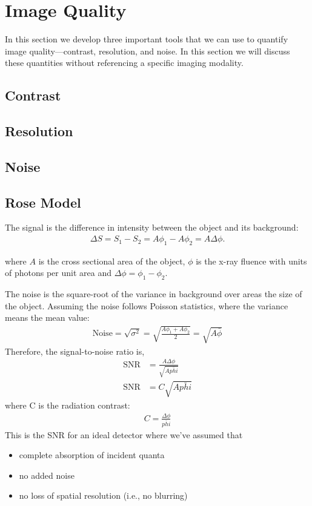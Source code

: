 \documentclass[mphy386-notes.tex]{subfiles}
\begin{document}
\section{Image Quality}
In this section we develop three important tools that we can use to quantify
image quality---contrast, resolution, and noise. In this section we will discuss
these quantities without referencing a specific imaging modality.


\subsection{Contrast}



\subsection{Resolution}
\subsection{Noise}
\subsection{Rose Model}

The signal is the difference in intensity between the object and its background:
\begin{align*}
  \Delta S = S_1 - S_2 = A\phi_1 - A\phi_2 = A\Delta\phi.
\end{align*}

where $A$ is the cross sectional area of the object, $\phi$ is the x-ray fluence
with units of photons per unit area and $\Delta\phi = \phi_1-\phi_2$.

The noise is the square-root of the variance in background over areas the size
of the object. Assuming the noise follows Poisson statistics, where the
variance means the mean value:
\begin{align*}
  \text{Noise} = \sqrt{\sigma^2} = \sqrt{\frac{A\phi_1 + A\phi_2}{2}} = \sqrt{A\bar{\phi}}
\end{align*}
Therefore, the signal-to-noise ratio is,
\begin{align*}
  \text{SNR} &= \frac{A\Delta\phi}{\sqrt{A\bar{phi}}}\\
  \text{SNR} &= C\sqrt{A\bar{phi}} 
\end{align*}
where C is the radiation contrast:
\begin{align*}
  C = \frac{\Delta\phi}{\bar{phi}}
\end{align*}
This is the SNR for an ideal detector where we've assumed that
\begin{itemize}
\item complete absorption of incident quanta
\item no added noise
\item no loss of spatial resolution (i.e., no blurring)
\end{itemize}


\pagebreak
\end{document}
